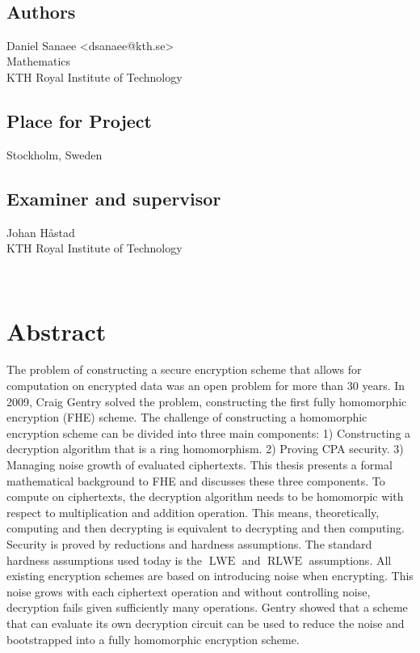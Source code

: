 \newpage
\thispagestyle{plain}
~\\
\vfill
{ 
	\section*{Authors}
	Daniel Sanaee <dsanaee@kth.se>\\
	Mathematics\\
	KTH Royal Institute of Technology
	
	\section*{Place for Project}
	Stockholm, Sweden
	
	\section*{Examiner and supervisor}
	Johan Håstad\\
	KTH Royal Institute of Technology
	
	~
}

\newpage
\thispagestyle{plain}
\chapter*{Abstract}

The problem of constructing a secure encryption scheme that allows for computation on encrypted data was an open problem for more than 30 years. In 2009, Craig Gentry solved the problem, constructing the first fully homomorphic encryption (FHE) scheme. The challenge of constructing a homomorphic encryption scheme can be divided into three main components: 1) Constructing a decryption algorithm that is a ring homomorphism. 2) Proving CPA security. 3) Managing noise growth of evaluated ciphertexts. This thesis presents a formal mathematical background to FHE and discusses these three components. To compute on ciphertexts, the decryption algorithm needs to be homomorpic with respect to multiplication and addition operation. This means, theoretically, computing and then decrypting is equivalent to decrypting and then computing. Security is proved by reductions and hardness assumptions. The standard hardness assumptions used today is the $\operatorname{LWE}$ and $\operatorname{RLWE}$ assumptions. All existing encryption schemes are based on introducing noise when encrypting. This noise grows with each ciphertext operation and without controlling noise, decryption fails given sufficiently many operations. Gentry showed that a scheme that can evaluate its own decryption circuit can be used to reduce the noise and bootstrapped into a fully homomorphic encryption scheme. 


